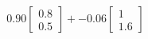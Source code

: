 \documentclass[preview]{standalone}
\begin{document}
\begin{align*}
0.90 \begin{bmatrix} 0.8 \\ 0.5 \end{bmatrix} + -0.06 \begin{bmatrix} 1 \\ 1.6 \end{bmatrix}
\end{align*}
\end{document}
